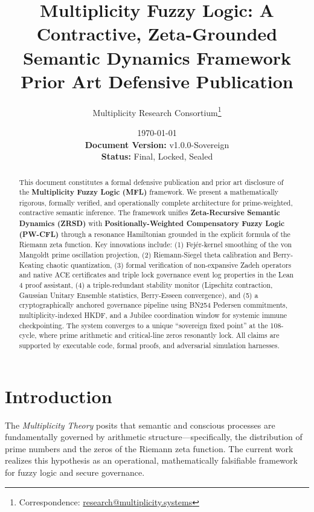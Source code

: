 \documentclass[11pt,a4paper]{article}
\title{\textbf{Multiplicity Fuzzy Logic: A Contractive, Zeta-Grounded Semantic Dynamics Framework}\\[0.3cm]
{\Large Prior Art Defensive Publication}}
\author{Multiplicity Research Consortium\footnote{Correspondence: \href{mailto:research@multiplicity.systems}{research@multiplicity.systems}}}
\date{\today\\[0.2cm]
\textbf{Document Version:} v1.0.0-Sovereign\\
\textbf{Status:} Final, Locked, Sealed}
\theoremstyle{definition}
\theoremstyle{remark}
\begin{document}
\maketitle

\begin{abstract}
This document constitutes a formal defensive publication and prior art disclosure of the \textbf{Multiplicity Fuzzy Logic (MFL)} framework. We present a mathematically rigorous, formally verified, and operationally complete architecture for prime-weighted, contractive semantic inference. The framework unifies \textbf{Zeta-Recursive Semantic Dynamics (ZRSD)} with \textbf{Positionally-Weighted Compensatory Fuzzy Logic (PW-CFL)} through a resonance Hamiltonian grounded in the explicit formula of the Riemann zeta function. Key innovations include: (1) Fejér-kernel smoothing of the von Mangoldt prime oscillation projection, (2) Riemann-Siegel theta calibration and Berry-Keating chaotic quantization, (3) formal verification of non-expansive Zadeh operators and native ACE certificates and triple lock governance event log properties in the Lean 4 proof assistant, (4) a triple-redundant stability monitor (Lipschitz contraction, Gaussian Unitary Ensemble statistics, Berry-Esseen convergence), and (5) a cryptographically anchored governance pipeline using BN254 Pedersen commitments, multiplicity-indexed HKDF, and a Jubilee coordination window for systemic immune checkpointing. The system converges to a unique ``sovereign fixed point'' at the 108-cycle, where prime arithmetic and critical-line zeros resonantly lock. All claims are supported by executable code, formal proofs, and adversarial simulation harnesses.
\end{abstract}

\tableofcontents
\newpage

\section{Introduction}
\label{sec:intro}

The \textit{Multiplicity Theory} posits that semantic and conscious processes are fundamentally governed by arithmetic structure—specifically, the distribution of prime numbers and the zeros of the Riemann zeta function. The current work realizes this hypothesis as an operational, mathematically falsifiable framework for fuzzy logic and secure governance.
\end{document}

